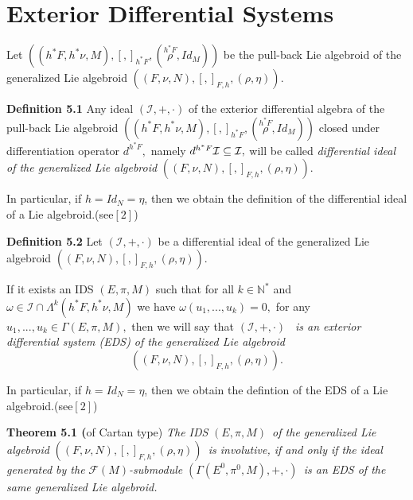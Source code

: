 \documentclass[11pt]{article}
\begin{document}
\section{Exterior Differential Systems}

Let $\left( \left( h^{\ast }F,h^{\ast }\nu ,M\right) ,\left[ ,\right]
_{h^{\ast }F},\left( \overset{h^{\ast }F}{\rho },Id_{M}\right) \right) $ be
the pull-back Lie algebroid of the generalized Lie algebroid $\left( \left(
F,\nu ,N\right) ,\left[ ,\right] _{F,h},\left( \rho ,\eta \right) \right) $.

\textbf{Definition 5.1 }Any ideal $\left( \mathcal{I},+,\cdot \right) $ of
the exterior differential algebra of the pull-back Lie algebroid $\left(
\left( h^{\ast }F,h^{\ast }\nu ,M\right) ,\left[ ,\right] _{h^{\ast
}F},\left( \overset{h^{\ast }F}{\rho },Id_{M}\right) \right) $ closed under
differentiation operator $d^{h^{\ast }F},$ namely $d^{h^{\ast }F}\mathcal{%
I\subseteq I},$ will be called \emph{differential ideal of the generalized
Lie algebroid }$\left( \left( F,\nu ,N\right) ,\left[ ,\right] _{F,h},\left(
\rho ,\eta \right) \right) .$

In particular, if $h=Id_{N}=\eta $, then we obtain the definition of the
differential ideal of a Lie algebroid.(see$\left[ 2\right] $)

\textbf{Definition 5.2 }Let $\left( \mathcal{I},+,\cdot \right) $ be a
differential ideal of the generalized Lie algebroid $\left( \left( F,\nu
,N\right) ,\left[ ,\right] _{F,h},\left( \rho ,\eta \right) \right) $.

If it exists an IDS $\left( E,\pi ,M\right) $ such that for all $k\in
\mathbb{N}^{\ast }$ and $\omega \in \mathcal{I}\cap \Lambda ^{k}\left(
h^{\ast }F,h^{\ast }\nu ,M\right) $ we have $\omega \left(
u_{1},...,u_{k}\right) =0,$ for any $u_{1},...,u_{k}\in \Gamma \left( E,\pi
,M\right) ,$ then we will say that $\left( \mathcal{I},+,\cdot \right) $%
\emph{\ is an exterior differential system (EDS) of the generalized Lie
algebroid }%
\begin{equation*}
\left( \left( F,\nu ,N\right) ,\left[ ,\right] _{F,h},\left( \rho ,\eta
\right) \right) .
\end{equation*}

In particular, if $h=Id_{N}=\eta $, then we obtain the defintion of the EDS
of a Lie algebroid.(see$\left[ 2\right] $)

\textbf{Theorem 5.1 (}of Cartan type) \emph{The IDS }$\left( E,\pi ,M\right)
$\emph{\ of the generalized Lie algebroid }$\left( \left( F,\nu ,N\right) ,%
\left[ ,\right] _{F,h},\left( \rho ,\eta \right) \right) $\emph{\ is
involutive, if and only if the ideal generated by the }$\mathcal{F}\left(
M\right) $\emph{-submodule }$\left( \Gamma \left( E^{0},\pi ^{0},M\right)
,+,\cdot \right) $\emph{\ is an EDS of the same generalized Lie algebroid.}
\end{document}
